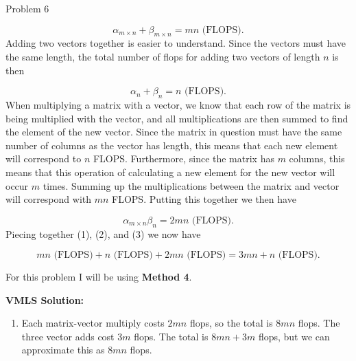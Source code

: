 \begin{problem}{Problem 6}
\begin{Highlight}
\begin{enumerate}[label = (\alph*)]
            \setcounter{equation}{0}
            \begin{equation}
                \alpha_{m \times n} + \beta_{m \times n} = mn \text{ (FLOPS)}.
            \end{equation}
            Adding two vectors together is easier to understand. Since the vectors must have the same length, the total number of flops for adding two vectors of length $n$ is then
    
            \begin{equation}
                \alpha_{n} + \beta_{n} = n \text{ (FLOPS)}.
            \end{equation}
            When multiplying a matrix with a vector, we know that each row of the matrix is being multiplied with the vector, and all multiplications are then summed to find the element of the new vector.
            Since the matrix in question must have the same number of columns as the vector has length, this means that each new element will correspond to $n$ FLOPS. Furthermore, since the matrix has 
            $m$ columns, this means that this operation of calculating a new element for the new vector will occur $m$ times. Summing up the multiplications between the matrix and vector will correspond
            with $mn$ FLOPS. Putting this together we then have
    
            \begin{equation}
                \alpha_{m \times n}\beta_{n} = 2mn \text{ (FLOPS)}.
            \end{equation}
            Piecing together (1), (2), and (3) we now have
    
            \begin{equation}
                mn \text{ (FLOPS)} + n \text{ (FLOPS)} + 2mn \text{ (FLOPS)} = 3mn + n \text{ (FLOPS)}.
            \end{equation}
        \end{enumerate}
    \end{Highlight}

    \begin{Highlight}
        For this problem I will be using \textbf{Method 4}. \vspace*{1em}

        \noindent \textbf{VMLS Solution:}

        \begin{enumerate}[label = (\alph*), start = 2]
            \item Each matrix-vector multiply costs $2mn$ flops, so the total is $8mn$ flops. The three vector adds cost $3m$ flops. The total is $8mn + 3m$ flops, but we can approximate this as $8mn$ flops.
        \end{enumerate}


\end{Highlight}
\end{problem}
